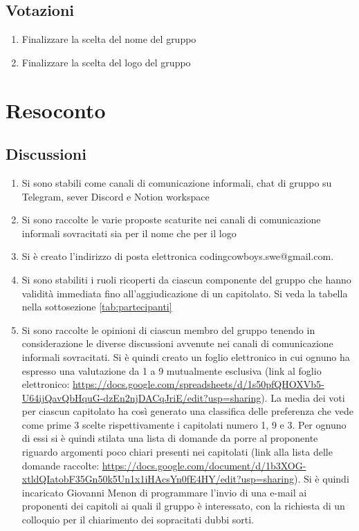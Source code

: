 \documentclass[12pt]{article}
\begin{document}
\subsection{Votazioni} \label{subsec:votazione}
\begin{enumerate}
    \item Finalizzare la scelta del nome del gruppo
    \item Finalizzare la scelta del logo del gruppo
\end{enumerate}
\section{Resoconto} \label{sec:resoconto}
\subsection{Discussioni} \label{subsec:resdiscussione}
\begin{enumerate}
    \item Si sono stabili come canali di comunicazione informali, chat di gruppo su Telegram, sever Discord e Notion workspace
    \item Si sono raccolte le varie proposte scaturite nei canali di comunicazione informali sovracitati sia per il nome che per il logo
    \item Si è creato l'indirizzo di posta elettronica codingcowboys.swe@gmail.com. 
    \item Si sono stabiliti i ruoli ricoperti da ciascun componente del gruppo che hanno validità immediata fino all'aggiudicazione di un capitolato. Si veda la tabella nella sottosezione \ref{tab:partecipanti}
    \item Si sono raccolte le opinioni di ciascun membro del gruppo tenendo in considerazione le diverse discussioni avvenute nei canali di comunicazione informali sovracitati. Si è quindi creato un foglio elettronico in cui ognuno ha espresso una valutazione da 1 a 9 mutualmente esclusiva (link al foglio elettronico: \url{https://docs.google.com/spreadsheets/d/1s50pfQHOXVb5-U64ijQavQbHquG-dzEn2njDACqJriE/edit?usp=sharing}). La media dei voti per ciascun capitolato ha così generato una classifica delle preferenza che vede come prime 3 scelte rispettivamente i capitolati numero 1, 9 e 3. Per ognuno di essi si è quindi stilata una lista di domande da porre al proponente riguardo argomenti poco chiari presenti nei capitolati (link alla lista delle domande raccolte: \url{https://docs.google.com/document/d/1b3XOG-xtldQIatobF35Gn50k5Un1x1iHAcsYn0fE4HY/edit?usp=sharing}). Si è quindi incaricato Giovanni Menon di programmare l'invio di una e-mail ai proponenti dei capitoli ai quali il gruppo è interessato, con la richiesta di un colloquio per il chiarimento dei sopracitati dubbi sorti.
    
\end{enumerate}
\end{document}
